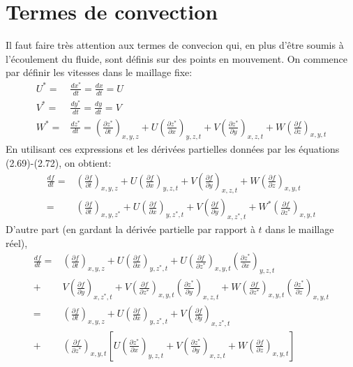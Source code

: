 \section*{Termes de convection}
Il faut faire très attention aux termes de convecion qui, en plus d'être soumis à l'écoulement du fluide, sont définis sur des points en mouvement. 
On commence par définir les vitesses dans le maillage fixe:
\begin{align*}
U^* =& \frac{d x^*}{d t} = \frac{d x}{d t} = U \\
V^* =& \frac{d y^*}{d t} = \frac{d y}{d t} =  V \\
W^* =& \frac{d z^*}{d t} = \left(\frac{\partial z^*}{\partial t}\right)_{x,y,z} + U \left(\frac{\partial z^*}{\partial x}\right)_{y,z,t} +V \left(\frac{\partial z^*}{\partial y}\right)_{x,z,t}+ W \left(\frac{\partial f}{\partial z}\right)_{x,y,t}
\end{align*}
En utilisant ces expressions et les dérivées partielles données par les équations (2.69)-(2.72), on obtient:
\begin{align*}
\frac{d f}{d t} =& \left(\frac{\partial f}{\partial t}\right)_{x,y,z} + U \left(\frac{\partial f}{\partial x}\right)_{y,z,t} +V \left(\frac{\partial f}{\partial y}\right)_{x,z,t}+ W \left(\frac{\partial f}{\partial z}\right)_{x,y,t}\\
=&\left(\frac{\partial f}{\partial t}\right)_{x,y,z^*} + U \left(\frac{\partial f}{\partial x}\right)_{y,z^*,t} + V \left(\frac{\partial f}{\partial y}\right)_{x,z^*,t} + W^*\left(\frac{\partial f}{\partial z^*}\right)_{x,y,t}
\end{align*}
D'autre part (en gardant la dérivée partielle par rapport à $t$ dans le maillage réel),
\begin{align*}
\frac{d f}{d t} 
=& \left(\frac{\partial f}{\partial t}\right)_{x,y,z}
 + U\left(\frac{\partial f}{\partial x}\right)_{y,z^*,t} + U \left(\frac{\partial f}{\partial z^*}\right)_{x,y,t}\left(\frac{\partial z^*}{\partial x}\right)_{y,z,t} \\
+& V  \left(\frac{\partial f}{\partial y}\right)_{x,z^*,t}
+V \left(\frac{\partial f}{\partial z^*}\right)_{x,y,t}\left(\frac{\partial z^*}{\partial y}\right)_{x,z,t} + W \left(\frac{\partial f}{\partial z^*}\right)_{x,y,t}\left(\frac{\partial z^*}{\partial z}\right)_{x,y,t} \\
=& \left(\frac{\partial f}{\partial t}\right)_{x,y,z} +  U \left(\frac{\partial f}{\partial x}\right)_{y,z^*,t} + V \left(\frac{\partial f}{\partial y}\right)_{x,z^*,t} \\
+& \left(\frac{\partial f}{\partial z^*}\right)_{x,y,t} \left[ U \left(\frac{\partial z^*}{\partial x}\right)_{y,z,t} +V \left(\frac{\partial z^*}{\partial y}\right)_{x,z,t}+ W \left(\frac{\partial f}{\partial z}\right)_{x,y,t} \right] \\
\end{align*}
